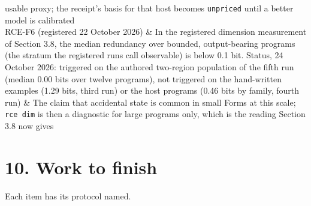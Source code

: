 \documentclass[10pt,letterpaper]{article}
\begin{document}
{{\begin{longtable}[]
usable proxy; the receipt's basis for that host becomes
\texttt{unpriced} until a better model is calibrated \\
RCE-F6 (registered 22 October 2026) & In the registered dimension
measurement of Section 3.8, the median redundancy over bounded,
output-bearing programs (the stratum the registered runs call
observable) is below 0.1 bit. Status, 24 October 2026: triggered on the
authored two-region population of the fifth run (median 0.00 bits over
twelve programs), not triggered on the hand-written examples (1.29 bits,
third run) or the host programs (0.46 bits by family, fourth run) & The
claim that accidental state is common in small Forms at this scale;
\texttt{rce\ dim} is then a diagnostic for large programs only, which is
the reading Section 3.8 now gives \\
\end{longtable}
}
}

\section{10. Work to finish}\label{work-to-finish}

Each item has its protocol named.
\end{document}
